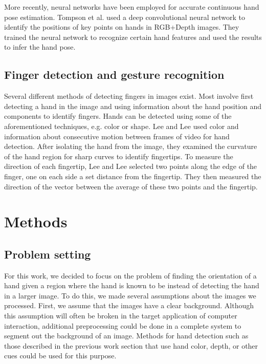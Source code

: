 \documentclass[10pt,twocolumn,letterpaper]{article}
\begin{document}
More recently, neural networks have been employed for accurate continuous hand pose estimation. Tompson et al. \cite{tompson2014real} used a deep convolutional neural network to identify the positions of key points on hands in RGB+Depth images. They trained the neural network to recognize certain hand features and used the results to infer the hand pose.

\subsection{Finger detection and gesture recognition}

Several different methods of detecting fingers in images exist. Most involve first detecting a hand in the image and using information about the hand position and components to identify fingers. Hands can be detected using some of the aforementioned techniques, e.g. color or shape. Lee and Lee \cite{lee2011vision} used color and information about consecutive motion between frames of video for hand detection. After isolating the hand from the image, they examined the curvature of the hand region for sharp curves to identify fingertips. To measure the direction of each fingertip, Lee and Lee selected two points along the edge of the finger, one on each side a set distance from the fingertip. They then measured the direction of the vector between the average of these two points and the fingertip.

\section{Methods}

\subsection{Problem setting} %

For this work, we decided to focus on the problem of finding the orientation of a hand given a region where the hand is known to be instead of detecting the hand in a larger image.  To do this, we made several assumptions about the images we processed. First, we assume that the images have a clear background.  Although this assumption will often be broken in the target application of computer interaction, additional preprocessing could be done in a complete system to segment out the background of an image.  Methods for hand detection such as those described in the previous work section that use hand color, depth, or other cues could be used for this purpose.
\end{document}
